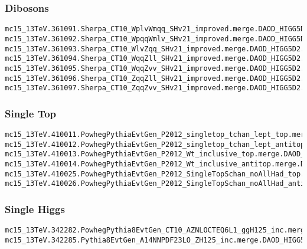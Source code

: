 \begin{scriptsize}
\subsubsection{Dibosons}
\fontsize{6}{7} \selectfont%


\begin{verbatim}
mc15_13TeV.361091.Sherpa_CT10_WplvWmqq_SHv21_improved.merge.DAOD_HIGG5D2.e4607_s2726_r7772_r7676_p2949
mc15_13TeV.361092.Sherpa_CT10_WpqqWmlv_SHv21_improved.merge.DAOD_HIGG5D2.e4607_s2726_r7772_r7676_p2949
mc15_13TeV.361093.Sherpa_CT10_WlvZqq_SHv21_improved.merge.DAOD_HIGG5D2.e4607_s2726_r7772_r7676_p2949
mc15_13TeV.361094.Sherpa_CT10_WqqZll_SHv21_improved.merge.DAOD_HIGG5D2.e4607_s2726_r7772_r7676_p2949
mc15_13TeV.361095.Sherpa_CT10_WqqZvv_SHv21_improved.merge.DAOD_HIGG5D2.e4607_s2726_r7772_r7676_p2949
mc15_13TeV.361096.Sherpa_CT10_ZqqZll_SHv21_improved.merge.DAOD_HIGG5D2.e4607_s2726_r7772_r7676_p2949
mc15_13TeV.361097.Sherpa_CT10_ZqqZvv_SHv21_improved.merge.DAOD_HIGG5D2.e4607_s2726_r7772_r7676_p2949
\end{verbatim}


\subsubsection{Single Top}
\fontsize{6}{7} \selectfont%

\begin{verbatim}
mc15_13TeV.410011.PowhegPythiaEvtGen_P2012_singletop_tchan_lept_top.merge.DAOD_HIGG5D2.e3824_s2608_s2183_r7725_r7676_p2949
mc15_13TeV.410012.PowhegPythiaEvtGen_P2012_singletop_tchan_lept_antitop.merge.DAOD_HIGG5D2.e3824_s2608_s2183_r7725_r7676_p2949
mc15_13TeV.410013.PowhegPythiaEvtGen_P2012_Wt_inclusive_top.merge.DAOD_HIGG5D2.e3753_s2608_s2183_r7725_r7676_p2949
mc15_13TeV.410014.PowhegPythiaEvtGen_P2012_Wt_inclusive_antitop.merge.DAOD_HIGG5D2.e3753_s2608_s2183_r7725_r7676_p2949
mc15_13TeV.410025.PowhegPythiaEvtGen_P2012_SingleTopSchan_noAllHad_top.merge.DAOD_HIGG5D2.e3998_s2608_s2183_r7725_r7676_p2949
mc15_13TeV.410026.PowhegPythiaEvtGen_P2012_SingleTopSchan_noAllHad_antitop.merge.DAOD_HIGG5D2.e3998_s2608_s2183_r7725_r7676_p2949
\end{verbatim}

\subsubsection{Single Higgs}
\fontsize{6}{7} \selectfont%

\begin{verbatim}
mc15_13TeV.342282.PowhegPythia8EvtGen_CT10_AZNLOCTEQ6L1_ggH125_inc.merge.DAOD_HIGG5D2.e4850_a766_a821_r7676_p2949
mc15_13TeV.342285.Pythia8EvtGen_A14NNPDF23LO_ZH125_inc.merge.DAOD_HIGG5D2.e4246_s2608_s2183_r7772_r7676_p2949
\end{verbatim}


\end{scriptsize}
